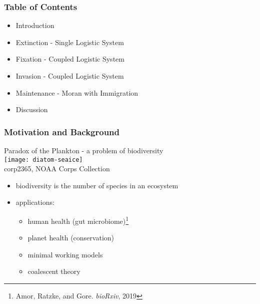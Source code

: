 \documentclass[dvipsnames]{beamer}
\begin{document}
\iffalse%
\begin{frame}
\frametitle{Table of Contents}
\begin{itemize}
	\item Introduction
	\item Extinction - Single Logistic System%
	\item Fixation - Coupled Logistic System%
	\item Invasion - Coupled Logistic System%
	\item Maintenance - Moran with Immigration
	\item Discussion
\end{itemize}
\end{frame}


\begin{frame}
\frametitle{Motivation and Background}
\begin{center}
	Paradox of the Plankton - a problem of biodiversity \\
	\texttt{[image: diatom-seaice]} \\
	\tiny{corp2365, NOAA Corps Collection}
\end{center}
\vspace{-0.5cm}
\begin{itemize}
	\item biodiversity is the number of species in an ecosystem
	\pause
	\item applications:
	\begin{itemize}
		\item human health (gut microbiome)\footnote{Amor, Ratzke, and Gore. \emph{bioRxiv}, 2019}
		\item planet health (conservation)
		\item minimal working models
		\item coalescent theory
	\end{itemize}
\end{itemize}
\end{frame}


\end{document}
